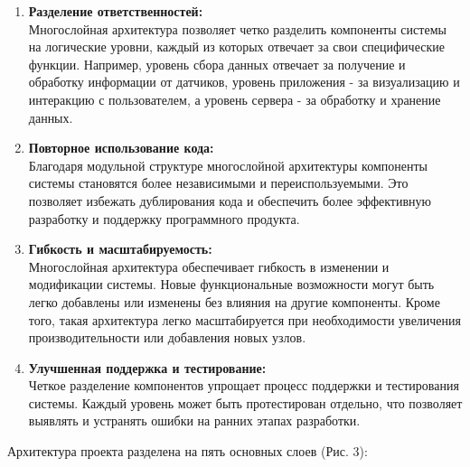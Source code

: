 \documentclass[12pt, russian]{extarticle}
\begin{document}
\begin{spacing}{1.5}
\begin {enumerate}
    \item \textbf{Разделение ответственностей:} \\
        Многослойная архитектура позволяет четко разделить компоненты системы на логические уровни, каждый из которых отвечает за свои специфические функции. Например, уровень сбора данных отвечает за получение и обработку информации от датчиков, уровень приложения - за визуализацию и интеракцию с пользователем, а уровень сервера - за обработку и хранение данных.
    \item \textbf{Повторное использование кода:} \\
        Благодаря модульной структуре многослойной архитектуры компоненты системы становятся более независимыми и переиспользуемыми. Это позволяет избежать дублирования кода и обеспечить более эффективную разработку и поддержку программного продукта.
    \item \textbf{Гибкость и масштабируемость:} \\
        Многослойная архитектура обеспечивает гибкость в изменении и модификации системы. Новые функциональные возможности могут быть легко добавлены или изменены без влияния на другие компоненты. Кроме того, такая архитектура легко масштабируется при необходимости увеличения производительности или добавления новых узлов.
    \item \textbf{Улучшенная поддержка и тестирование:} \\
        Четкое разделение компонентов упрощает процесс поддержки и тестирования системы. Каждый уровень может быть протестирован отдельно, что позволяет выявлять и устранять ошибки на ранних этапах разработки.
\end{enumerate}

\newpage
Архитектура проекта разделена на пять основных слоев (Рис. 3):


\end{spacing}
\end{document}
